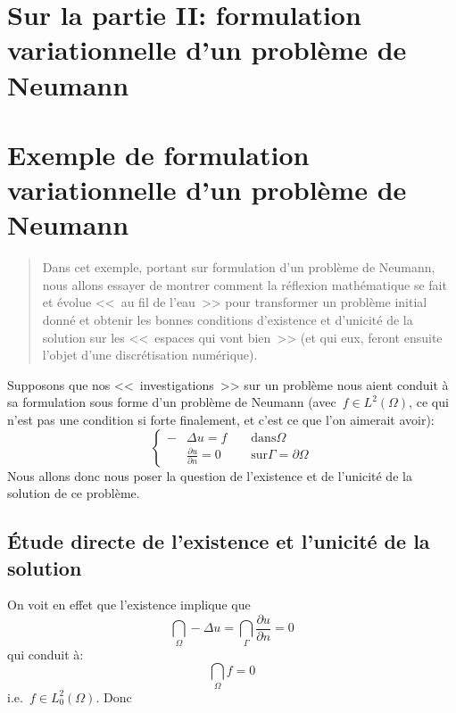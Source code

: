 \ifVersionAvecExemplesSepares
  \chapter{Sur la partie II: formulation variationnelle d'un problème de Neumann}
\else
  \chapter{Exemple de formulation variationnelle d'un problème de Neumann}
\fi
\begin{abstract}
Dans cet exemple, portant sur formulation d'un problème de Neumann,
nous allons essayer de montrer comment la réflexion mathématique se
fait et évolue <<~au fil de l'eau~>> pour transformer un problème initial donné et obtenir
les bonnes conditions d'existence et d'unicité de la solution sur les <<~espaces qui vont
bien~>> (et qui eux, feront ensuite l'objet d'une discrétisation numérique).
\end{abstract}

Supposons que nos <<~investigations~>> sur un problème nous aient
conduit à sa formulation sous forme d'un problème de Neumann
(avec~$f\in L^2(\Omega)$, ce qui n'est pas une condition si forte finalement, et c'est ce que l'on aimerait avoir):
\begin{equation}\left\{
\begin{aligned}
-&\Delta u = f && \text{ dans} \Omega\\
&\frac{\partial u}{\partial n}=0 && \text{ sur}\Gamma=\partial\Omega
\end{aligned}
\right.
\end{equation}
Nous allons donc nous poser la question de l'existence et de l'unicité de la solution de ce problème.

\medskip
\section{Étude directe de l'existence et l'unicité de la solution}

On voit en effet que l'existence implique que
\begin{equation}\dint_\Omega -\Delta u = \dint_\Gamma \frac{\partial u}{\partial n}=0\end{equation}
qui conduit à:\begin{equation}\dint_\Omega f =0\end{equation} i.e.~$f\in L^2_0(\Omega)$.
Donc 

